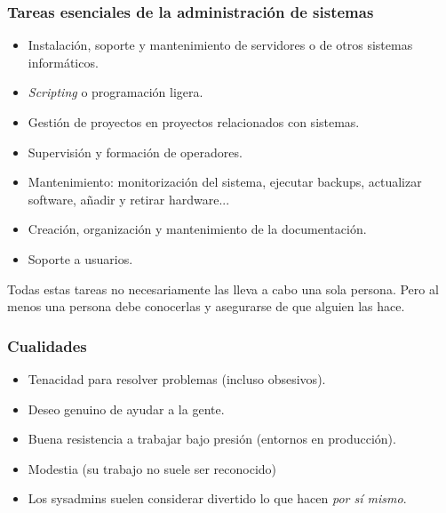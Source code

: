 \documentclass{beamer}
\begin{document}

\begin{frame}
\frametitle{Tareas esenciales de la administración de sistemas}

\begin{itemize}
\item Instalación, soporte y mantenimiento de servidores o de otros sistemas informáticos.
\item \textit{Scripting} o programación ligera. 
\item Gestión de proyectos en proyectos relacionados con sistemas. 
\item Supervisión y formación de operadores. 
\item Mantenimiento: monitorización del sistema, ejecutar backups, actualizar software, añadir y retirar hardware...
\item Creación, organización y mantenimiento de la documentación.
\item Soporte a usuarios.
\end{itemize}

\small

Todas estas tareas no necesariamente las lleva a cabo una sola persona. Pero al menos una persona debe conocerlas y asegurarse de que alguien las hace.

\end{frame}



\begin{frame}
\frametitle{Cualidades}

\begin{itemize}
\item Tenacidad para resolver problemas (incluso obsesivos).
\item Deseo genuino de ayudar a la gente.
\item Buena resistencia a trabajar bajo presión (entornos en producción).
\item Modestia (su trabajo no suele ser reconocido)
\item Los sysadmins suelen considerar divertido lo que hacen \textit{por sí mismo}.
\end{itemize}
\end{frame}

\end{document}
